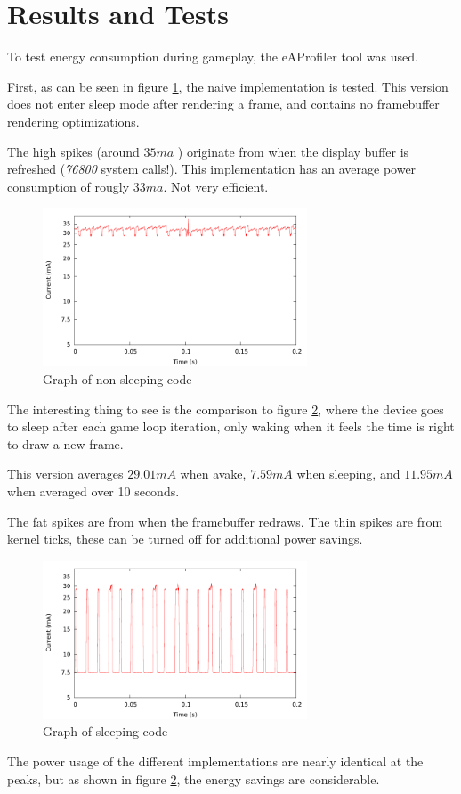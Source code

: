 \section{Results and Tests}
To test energy consumption during gameplay, the eAProfiler tool was used.

First, as can be seen in figure \ref{fig:nosleep},
the naive implementation is tested.
This version does not enter sleep mode after rendering a frame,
and contains no framebuffer rendering optimizations.

The high spikes (around $ 35 ma $ ) originate from when the
display buffer is refreshed (\emph{76800} system calls!). This implementation has an average
power consumption of rougly $ 33 ma $. Not very efficient.

\begin{figure}[H]
\centering
\includegraphics[width=0.7\textwidth]{figures/nosleep.pdf}
\caption{Graph of non sleeping code}
\label{fig:nosleep}
\end{figure}

The interesting thing to see is the comparison to figure
\ref{fig:sleep}, where the device goes to sleep after each
game loop iteration, only waking when it feels the time is
right to draw a new frame.

This version averages $ 29.01 mA $ when avake,
$ 7.59 mA $ when sleeping,
and $ 11.95 mA $ when averaged over 10 seconds.

The fat spikes are from when the framebuffer redraws.
The thin spikes are from kernel ticks,
these can be turned off for additional power savings.

\begin{figure}[H]
\centering
\includegraphics[width=0.7\textwidth]{figures/sleep.pdf}
\caption{Graph of sleeping code}
\label{fig:sleep}
\end{figure}

The power usage of the different implementations are nearly identical at the
peaks, but as shown in figure \ref{fig:sleep}, the energy savings are considerable.

